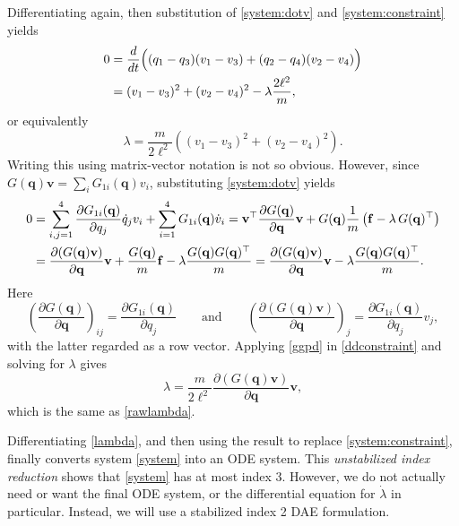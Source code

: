 \documentclass[letterpaper,final,12pt,reqno]{amsart}
\newcommand{\bbf}{\mathbf{f}}
\newcommand{\bq}{\mathbf{q}}
\newcommand{\bv}{\mathbf{v}}
\begin{document}
Differentiating again, then substitution of \eqref{system:dotv} and \eqref{system:constraint} yields
\begin{align}
0 &= \frac{d}{dt} \Big((q_1 - q_3)(v_1 - v_3) + (q_2 - q_4) (v_2 - v_4)\Big) \notag \\
  &= (v_1 - v_3)^2 + (v_2 - v_4)^2 - \lambda \frac{2 \ell^2}{m}, \label{rawddconstraint}
\end{align}
or equivalently
\begin{equation}
\lambda = \frac{m}{2\ell^2} \left((v_1 - v_3)^2 + (v_2 - v_4)^2\right). \label{rawlambda}
\end{equation}
Writing this using matrix-vector notation is not so obvious.  However, since $G(\bq)\bv = \sum_i G_{1i}(\bq) v_i$, substituting \eqref{system:dotv} yields
\begin{align}
0 &= \sum_{i,j=1}^4 \frac{\partial G_{1i}(\bq)}{\partial q_j} \dot q_j v_i + \sum_{i=1}^4 G_{1i}(\bq) \dot v_i = \bv^\top \frac{\partial G(\bq)}{\partial \bq} \bv + G(\bq) \frac{1}{m} \left(\bbf - \lambda\, G(\bq)^\top\right) \notag \\
  &= \frac{\partial (G(\bq)\bv)}{\partial \bq} \bv +  \frac{G(\bq)}{m} \bbf - \lambda \frac{G(\bq) G(\bq)^\top}{m} = \frac{\partial (G(\bq)\bv)}{\partial \bq} \bv - \lambda \frac{G(\bq) G(\bq)^\top}{m}.  \label{ddconstraint}
\end{align}
Here
\begin{equation}
\left(\frac{\partial G(\bq)}{\partial \bq}\right)_{ij} = \frac{\partial G_{1i}(\bq)}{\partial q_j} \qquad \text{and} \qquad
\left(\frac{\partial (G(\bq)\bv)}{\partial \bq}\right)_{j} = \frac{\partial G_{1i}(\bq)}{\partial q_j} v_j,
\end{equation}
with the latter regarded as a row vector.  Applying \eqref{ggpd} in \eqref{ddconstraint} and solving for $\lambda$ gives
\begin{equation}
\lambda = \frac{m}{2\ell^2} \frac{\partial (G(\bq)\bv)}{\partial \bq} \bv, \label{lambda}
\end{equation}
which is the same as \eqref{rawlambda}.

Differentiating \eqref{lambda}, and then using the result to replace \eqref{system:constraint}, finally converts system \eqref{system} into an ODE system.  This \emph{unstabilized index reduction} shows that \eqref{system} has at most index 3.  However, we do not actually need or want the final ODE system, or the differential equation for $\dot \lambda$ in particular.  Instead, we will use a stabilized index 2 DAE formulation.
\end{document}
